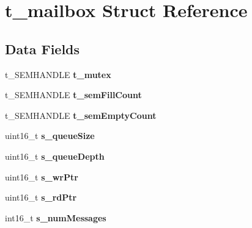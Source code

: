 \hypertarget{structt__mailbox}{\section{t\-\_\-mailbox Struct Reference}
\label{structt__mailbox}
}
\subsection*{Data Fields}
\begin{DoxyCompactItemize}
\item 
\hypertarget{structt__mailbox_ab0543e5662ae0b4ef5014d2c76ab248d}{t\-\_\-\-S\-E\-M\-H\-A\-N\-D\-L\-E {\bfseries t\-\_\-mutex}}\label{structt__mailbox_ab0543e5662ae0b4ef5014d2c76ab248d}

\item 
\hypertarget{structt__mailbox_a50918f278d84dd2c220732bb6187b490}{t\-\_\-\-S\-E\-M\-H\-A\-N\-D\-L\-E {\bfseries t\-\_\-sem\-Fill\-Count}}\label{structt__mailbox_a50918f278d84dd2c220732bb6187b490}

\item 
\hypertarget{structt__mailbox_a881a275e21ae03f39bf8f8191de1d63f}{t\-\_\-\-S\-E\-M\-H\-A\-N\-D\-L\-E {\bfseries t\-\_\-sem\-Empty\-Count}}\label{structt__mailbox_a881a275e21ae03f39bf8f8191de1d63f}

\item 
\hypertarget{structt__mailbox_a5f69c635dea1a6b7fdcc4f4930fb3fe3}{uint16\-\_\-t {\bfseries s\-\_\-queue\-Size}}\label{structt__mailbox_a5f69c635dea1a6b7fdcc4f4930fb3fe3}

\item 
\hypertarget{structt__mailbox_a07e90e2e1a8032b361dcdc6e281a06f3}{uint16\-\_\-t {\bfseries s\-\_\-queue\-Depth}}\label{structt__mailbox_a07e90e2e1a8032b361dcdc6e281a06f3}

\item 
\hypertarget{structt__mailbox_a352e66257dab91687461f5a0566031fd}{uint16\-\_\-t {\bfseries s\-\_\-wr\-Ptr}}\label{structt__mailbox_a352e66257dab91687461f5a0566031fd}

\item 
\hypertarget{structt__mailbox_a8e62490ee4bd998e2bfc18c83cc8c2aa}{uint16\-\_\-t {\bfseries s\-\_\-rd\-Ptr}}\label{structt__mailbox_a8e62490ee4bd998e2bfc18c83cc8c2aa}

\item 
\hypertarget{structt__mailbox_a7887753e7d5e140ec0675436f19e6e19}{int16\-\_\-t {\bfseries s\-\_\-num\-Messages}}\label{structt__mailbox_a7887753e7d5e140ec0675436f19e6e19}


\end{DoxyCompactItemize}
